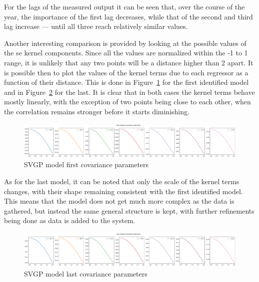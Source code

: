 For the lags of the measured output it can be seen that, over the course of the
year, the importance of the first lag decreases, while that of the second and
third lag increase --- until all three reach relatively similar values.

Another interesting comparison is provided by looking at the possible values of
the \acrshort{se} kernel components. Since all the values are normalized within
the -1 to 1 range, it is unlikely that any two points will be a distance higher
than 2 apart. It is possible then to plot the values of the kernel terms due to
each regressor as a function of their distance. This is done in
Figure~\ref{fig:SVGP_first_covariance} for the first identified model and in
Figure~\ref{fig:SVGP_last_covariance} for the last. It is clear that in both
cases the kernel terms behave mostly linearly, with the exception of two points
being close to each other, when the correlation remains stronger before it
starts diminishing.

\begin{figure}[ht]
    \centering
    \includegraphics[width =
    \textwidth]{Plots/1_SVGP_480pts_inf_window_12_averageYear_first_covariance.pdf}
    \caption{SVGP model first covariance parameters}
    \label{fig:SVGP_first_covariance}
\end{figure}

As for the last model, it can be noted that only the scale of the kernel terms
changes, with their shape remaining consistent with the first identified model.
This means that the model does not get much more complex as the data is
gathered, but instead the same general structure is kept, with further
refinements being done as data is added to the system.

\begin{figure}[ht]
    \centering
    \includegraphics[width =
    \textwidth]{Plots/1_SVGP_480pts_inf_window_12_averageYear_last_covariance.pdf}
    \caption{SVGP model last covariance parameters}
    \label{fig:SVGP_last_covariance}
\end{figure}

